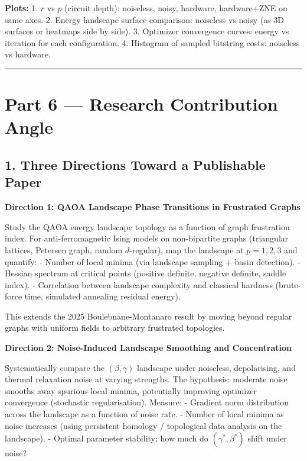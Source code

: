 \documentclass[
  11pt,
]{report}
\begin{document}
\textbf{Plots:} 1. \(r\) vs \(p\) (circuit depth): noiseless, noisy,
hardware, hardware+ZNE on same axes. 2. Energy landscape surface
comparison: noiseless vs noisy (as 3D surfaces or heatmaps side by
side). 3. Optimizer convergence curves: energy vs iteration for each
configuration. 4. Histogram of sampled bitstring costs: noiseless vs
hardware.

\begin{center}\rule{0.5\linewidth}{0.5pt}\end{center}

\section{Part 6 --- Research Contribution
Angle}\label{part-6-research-contribution-angle}

\subsection{1. Three Directions Toward a Publishable
Paper}\label{three-directions-toward-a-publishable-paper}

\textbf{Direction 1: QAOA Landscape Phase Transitions in Frustrated
Graphs}

Study the QAOA energy landscape topology as a function of graph
frustration index. For anti-ferromagnetic Ising models on non-bipartite
graphs (triangular lattices, Petersen graph, random \(d\)-regular), map
the landscape at \(p = 1, 2, 3\) and quantify: - Number of local minima
(via landscape sampling + basin detection). - Hessian spectrum at
critical points (positive definite, negative definite, saddle index). -
Correlation between landscape complexity and classical hardness
(brute-force time, simulated annealing residual energy).

This extends the 2025 Boulebnane-Montanaro result by moving beyond
regular graphs with uniform fields to arbitrary frustrated topologies.

\textbf{Direction 2: Noise-Induced Landscape Smoothing and
Concentration}

Systematically compare the \((\beta, \gamma)\) landscape under
noiseless, depolarising, and thermal relaxation noise at varying
strengths. The hypothesis: moderate noise smooths away spurious local
minima, potentially improving optimizer convergence (stochastic
regularisation). Measure: - Gradient norm distribution across the
landscape as a function of noise rate. - Number of local minima as noise
increases (using persistent homology / topological data analysis on the
landscape). - Optimal parameter stability: how much do
\((\gamma^*, \beta^*)\) shift under noise?
\end{document}
